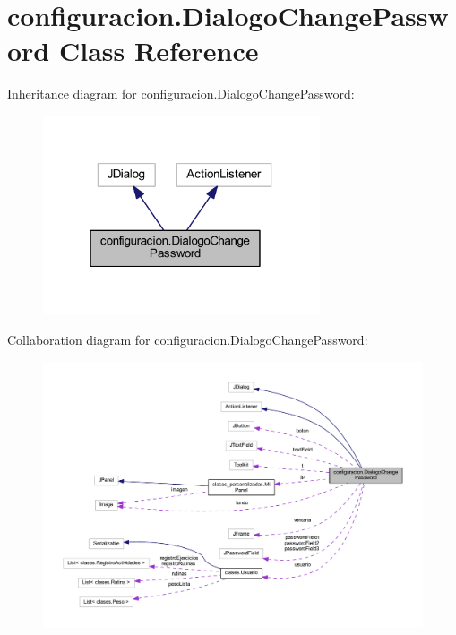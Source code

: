 \hypertarget{classconfiguracion_1_1_dialogo_change_password}{}\section{configuracion.\+Dialogo\+Change\+Password Class Reference}
\label{classconfiguracion_1_1_dialogo_change_password}


Inheritance diagram for configuracion.\+Dialogo\+Change\+Password\+:
\nopagebreak
\begin{figure}[H]
\begin{center}
\leavevmode
\includegraphics[width=232pt]{classconfiguracion_1_1_dialogo_change_password__inherit__graph}
\end{center}
\end{figure}


Collaboration diagram for configuracion.\+Dialogo\+Change\+Password\+:
\nopagebreak
\begin{figure}[H]
\begin{center}
\leavevmode
\includegraphics[width=350pt]{classconfiguracion_1_1_dialogo_change_password__coll__graph}
\end{center}
\end{figure}
